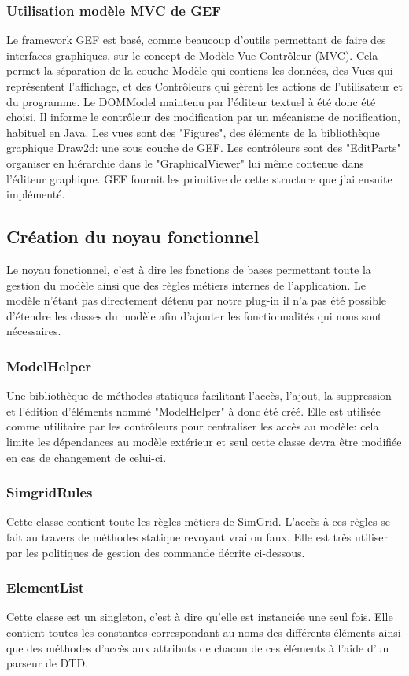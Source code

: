 \documentclass{article}
\begin{document}
    \subsubsection{Utilisation modèle MVC de GEF}
    Le framework GEF est basé, comme beaucoup d'outils permettant de faire des interfaces graphiques, sur le concept de Modèle Vue Contrôleur (MVC). Cela permet la séparation de la couche Modèle qui contiens les données, des Vues qui représentent l'affichage, et des Contrôleurs qui gèrent les actions de l'utilisateur et du programme. Le DOMModel maintenu par l'éditeur textuel à été donc été choisi. Il informe le contrôleur des modification par un mécanisme de notification, habituel en Java. Les vues sont des "Figures", des éléments de la bibliothèque graphique Draw2d: une sous couche de GEF. Les contrôleurs sont des "EditParts" organiser en hiérarchie dans le "GraphicalViewer" lui même contenue dans l'éditeur graphique. GEF fournit les primitive de cette structure que j'ai ensuite implémenté.
    \subsection{Création du noyau fonctionnel}
    	Le noyau fonctionnel, c'est à dire les fonctions de bases permettant toute la gestion du modèle ainsi que des règles métiers internes de l'application. Le modèle n'étant pas directement détenu par notre plug-in il n'a pas été possible d'étendre les classes du modèle afin d'ajouter les fonctionnalités qui nous sont nécessaires.
        \subsubsection{ModelHelper}
        Une bibliothèque de méthodes statiques facilitant l'accès, l'ajout, la suppression et l'édition d'éléments nommé "ModelHelper" à donc été créé. Elle est utilisée comme utilitaire par les contrôleurs pour centraliser les accès au modèle: cela limite les dépendances au modèle extérieur et seul cette classe devra être modifiée en cas de changement de celui-ci.
        \subsubsection{SimgridRules}
        Cette classe contient toute les règles métiers de SimGrid. L'accès à ces règles se fait au travers de méthodes statique revoyant vrai ou faux. Elle est très utiliser par les politiques de gestion des commande décrite ci-dessous.
        \subsubsection{ElementList}
        Cette classe est un singleton, c'est à dire qu'elle est instanciée une seul fois. Elle contient toutes les constantes correspondant au noms des différents éléments ainsi que des méthodes d'accès aux attributs de chacun de ces éléments à l'aide d'un parseur de DTD.
\end{document}
